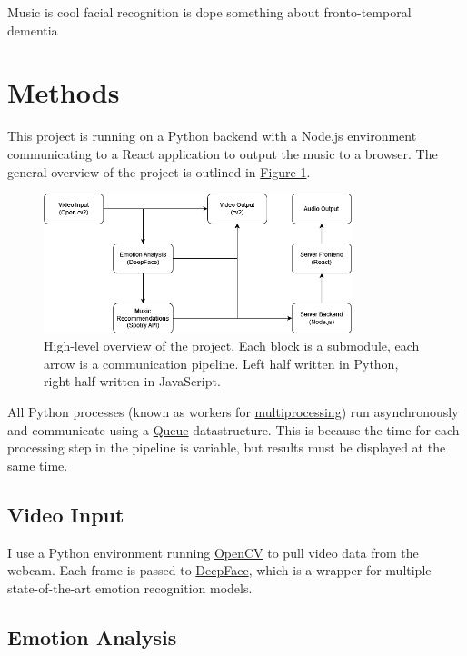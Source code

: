 \documentclass{article}
\renewcommand{\_}[1]{\underline{ #1 }}
\theoremstyle{definition}
\begin{document}
Music is cool facial recognition is dope something about fronto-temporal dementia

\section[Methods]{Methods}
\label{Methods}

This project is running on a Python backend with a Node.js environment communicating to a React application to output the music to a browser. The general overview of the project is outlined in \hyperref[fig1]{Figure 1}.

\begin{figure}[h]
    \centering
    \includegraphics[width=0.8\textwidth]{FtM Project.drawio.png}
    \caption{High-level overview of the project. Each block is a submodule, each arrow is a communication pipeline. Left half written in Python, right half written in JavaScript.}
    \label{fig1}
\end{figure}

All Python processes (known as workers for \href{https://docs.python.org/3/library/multiprocessing.html}{multiprocessing}) run asynchronously and communicate using a \href{https://docs.python.org/3/library/queue.html}{Queue} datastructure. This is because the time for each processing step in the pipeline is variable, but results must be displayed at the same time. 

\subsection[Video Input]{Video Input}

I use a Python environment running \href{https://pypi.org/project/opencv-python/}{OpenCV} to pull video data from the webcam. Each frame is passed to \href{https://pypi.org/project/deepface/}{DeepFace}, which is a wrapper for multiple state-of-the-art emotion recognition models.

\subsection[Emotion Analysis]{Emotion Analysis}
\end{document}
